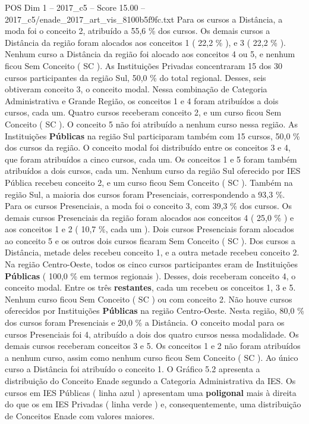 \begin{textsample}{POS Dim 1 – 2017\_c5 – Score 15.00 – 2017\_c5/enade\_2017\_art\_vis\_8100b5f9fc.txt}
Para os cursos a Distância, a moda foi o conceito 2, atribuído a 55,6 \% dos cursos.
Os demais cursos a Distância da região foram alocados aos conceitos 1 ( 22,2 \% ), e 3 ( 22,2 \% ).
Nenhum curso a Distância da região foi alocado aos conceitos 4 ou 5, e nenhum ficou Sem Conceito ( SC ).
As Instituições Privadas concentraram 15 dos 30 cursos participantes da região Sul, 50,0 \% do total regional.
Desses, seis obtiveram conceito 3, o conceito modal.
Nessa combinação de Categoria Administrativa e Grande Região, os conceitos 1 e 4 foram atribuídos a dois cursos, cada um.
Quatro cursos receberam conceito 2, e um curso ficou Sem Conceito ( SC ).
O conceito 5 não foi atribuído a nenhum curso nessa região.
As Instituições \textbf{Públicas} na região Sul participaram também com 15 cursos, 50,0 \% dos cursos da região.
O conceito modal foi distribuído entre os conceitos 3 e 4, que foram atribuídos a cinco cursos, cada um.
Os conceitos 1 e 5 foram também atribuídos a dois cursos, cada um.
Nenhum curso da região Sul oferecido por IES Pública recebeu conceito 2, e um curso ficou Sem Conceito ( SC ).
Também na região Sul, a maioria dos cursos foram Presenciais, correspondendo a 93,3 \%.
Para os cursos Presenciais, a moda foi o conceito 3, com 39,3 \% dos cursos.
Os demais cursos Presenciais da região foram alocados aos conceitos 4 ( 25,0 \% ) e aos conceitos 1 e 2 ( 10,7 \%, cada um ).
Dois cursos Presenciais foram alocados ao conceito 5 e os outros dois cursos ficaram Sem Conceito ( SC ).
Dos cursos a Distância, metade deles recebeu conceito 1, e a outra metade recebeu conceito 2.
Na região Centro-Oeste, todos os cinco cursos participantes eram de Instituições \textbf{Públicas} ( 100,0 \% em termos regionais ).
Desses, dois receberam conceito 4, o conceito modal.
Entre os três \textbf{restantes}, cada um recebeu os conceitos 1, 3 e 5.
Nenhum curso ficou Sem Conceito ( SC ) ou com conceito 2.
Não houve cursos oferecidos por Instituições \textbf{Públicas} na região Centro-Oeste.
Nesta região, 80,0 \% dos cursos foram Presenciais e 20,0 \% a Distância.
O conceito modal para os cursos Presenciais foi 4, atribuído a dois dos quatro cursos nessa modalidade.
Os demais cursos receberam conceitos 3 e 5.
Os conceitos 1 e 2 não foram atribuídos a nenhum curso, assim como nenhum curso ficou Sem Conceito ( SC ).
Ao único curso a Distância foi atribuído o conceito 1.
O Gráfico 5.2 apresenta a distribuição do Conceito Enade segundo a Categoria Administrativa da IES.
Os cursos em IES Públicas ( linha azul ) apresentam uma \textbf{poligonal} mais à direita do que os em IES Privadas ( linha verde ) e, consequentemente, uma distribuição de Conceitos Enade com valores maiores.

\end{textsample}
